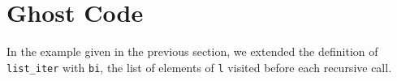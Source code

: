 \documentclass[a4paper,11pt,oneside]{article}
\theoremstyle{plain}
\newcommand{\inlsrc}{\textit{ML}^{^2}}
\begin{document}
%
%   
%   

%
% 	
	
	
		
	
		
	

\newpage
\section{Ghost Code}

In the example given in the previous section, we extended the definition of \texttt{list\_iter} with \texttt{bi}, the list of elements of \texttt{l} visited before each recursive call.
\end{document}
